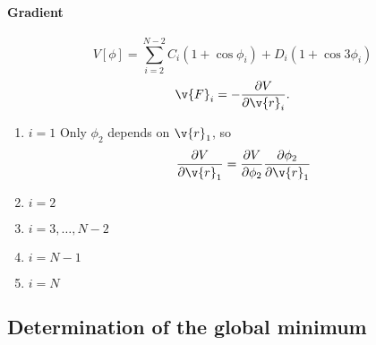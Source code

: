 \paragraph{Gradient}

\begin{equation}
  V[\phi]=\sum_{i=2}^{N-2}C_i(1+\cos{\phi_i})+D_i(1+\cos{3\phi_i})
\end{equation}
\begin{equation}
  \v{F}_i=-\frac{\partial V}{\partial \v{r}_i}.
\end{equation}
\begin{enumerate}
  \item $i=1$ Only $\phi_2$ depends on $\v{r}_1$, so
    \begin{equation}
      \frac{\partial V}{\partial \v{r}_1}=
      {\frac{\partial V}{\partial\phi_2}}
      {\frac{\partial\phi_2}{\partial\v{r}_1}}
    \end{equation}
  \item $i=2$
  \item $i=3,\ldots,N-2$
  \item $i=N-1$
  \item $i=N$
\end{enumerate}

\subsection{Determination of the global minimum}


